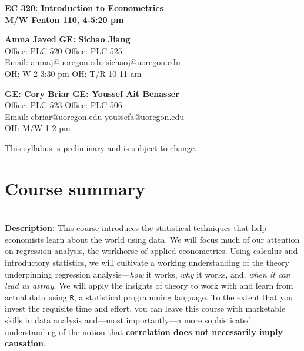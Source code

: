 \documentclass[11pt]{article}
\begin{document}
\begin{center}
\textbf{\Large EC 320: Introduction to Econometrics\\
M/W Fenton 110, 4-5:20 pm }
\end{center}

\vspace{0.2in}

 \textbf{\large Amna Javed }
  \hfill  
 \textbf{ \large GE: Sichao Jiang} \\  
 \large Office: PLC 520
 \hfill 
 \large Office: PLC 525\\
  \large Email: amnaj@uoregon.edu 
 \hfill 
 \large sichaoj@uoregon.edu \\ 
 \large OH: W 2-3:30 pm 
 \hfill 
  \large OH: T/R 10-11 am

\bigskip

 \textbf{\large GE: Cory Briar}
  \hfill  
 \textbf{ \large GE: Youssef Ait Benasser} \\  
 \large Office: PLC 523
 \hfill 
 \large Office: PLC 506\\
  \large Email:  cbriar@uoregon.edu
 \hfill 
 \large   youssefa@uoregon.edu \\ 
 \large OH: M/W 1-2 pm
 \hfill 
 
\vspace{5mm}

\begin{center}  This syllabus is preliminary and is subject to change.  \\
\end{center}


\section*{Course summary}

\textbf {\large \\ Description:} This course introduces the statistical techniques that help economists learn about the world using data. We will focus much of our attention on regression analysis, the workhorse of applied econometrics. Using calculus and introductory statistics, we will cultivate a working understanding of the theory underpinning regression analysis---\textit{how} it works, \textit{why} it works, and, \textit{when it can lead us astray}. We will apply the insights of theory to work with and learn from actual data using \texttt{{R}}, a statistical programming language. To the extent that you invest the requisite time and effort, you can leave this course with marketable skills in data analysis and---most importantly---a more sophisticated understanding of the notion that \textbf{correlation does not necessarily imply causation}. 
\end{document}
